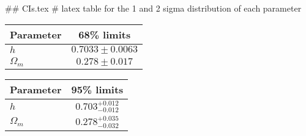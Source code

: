 ## CIs.tex
# latex table for the 1 and 2 sigma distribution of each parameter

\begin{tabular} { l  c}
 Parameter &  68\% limits\\
\hline
{\boldmath$h              $} & $0.7033\pm 0.0063          $\\
{\boldmath$\Omega_m       $} & $0.278\pm 0.017            $\\
\hline
\end{tabular}

\begin{tabular} { l  c}
 Parameter &  95\% limits\\
\hline
{\boldmath$h              $} & $0.703^{+0.012}_{-0.012}   $\\
{\boldmath$\Omega_m       $} & $0.278^{+0.035}_{-0.032}   $\\
\hline
\end{tabular}
